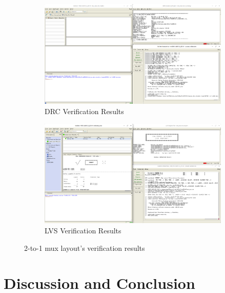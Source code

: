 \documentclass[letterpaper, 11pt]{article}
\begin{document}
\begin{figure}[htb!]
	\centering
	\begin{subfigure}[htb]{.9\linewidth}
		\includegraphics[width=\textwidth]{mux_drc_final.png}
		\caption{DRC Verification Results}
		\label{fig8a}
	\end{subfigure}
	\begin{subfigure}[htb]{.9\linewidth}
		\includegraphics[width=\textwidth]{mux_lvs_final.png}
		\caption{LVS Verification Results}
		\label{fig8b}
	\end{subfigure}
	\caption{2-to-1 mux layout's verification results}
\end{figure}
\newpage

\section{Discussion and Conclusion}
\label{sec:disc_and_concl}
\end{document}
